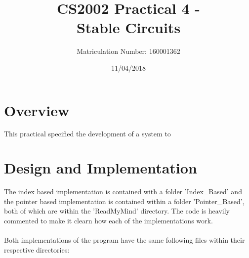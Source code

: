 \documentclass[11]{article}
\title{CS2002 Practical 4 - \\Stable Circuits}
\date{11/04/2018}
\author{Matriculation Number: 160001362}
\begin{document}
	
	\maketitle
	\newpage
	\tableofcontents
	
	\newpage
	\section{Overview}
	This practical specified the development of a system to 
	\section{Design and Implementation}
		The index based implementation is contained with a folder 'Index\_Based' and the pointer based implementation is contained within a folder 'Pointer\_Based', both of which are within the 'ReadMyMind' directory. The code is heavily commented to make it clearn how each of the implementations work. \\\\Both implementations of the program have the same following files within their respective directories:
\end{document}
